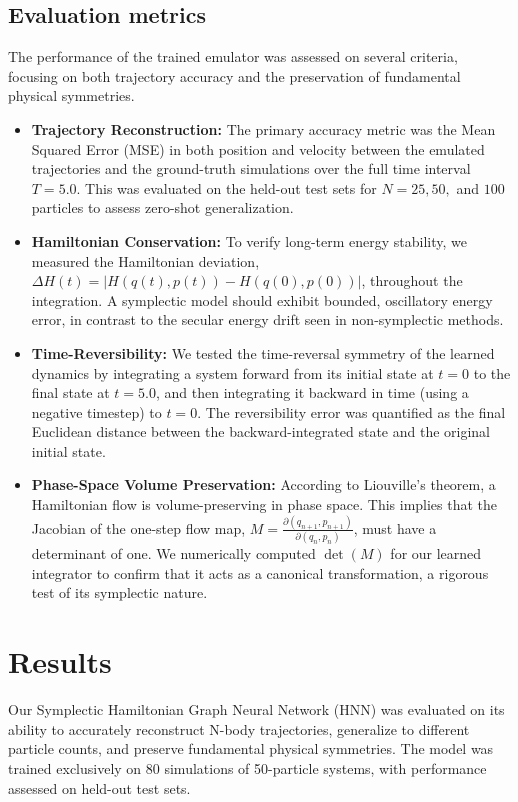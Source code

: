 \documentclass[]{article}
\begin{document}
\subsection{Evaluation metrics}
The performance of the trained emulator was assessed on several criteria, focusing on both trajectory accuracy and the preservation of fundamental physical symmetries.
\begin{itemize}
    \item \textbf{Trajectory Reconstruction:} The primary accuracy metric was the Mean Squared Error (MSE) in both position and velocity between the emulated trajectories and the ground-truth simulations over the full time interval $T=5.0$. This was evaluated on the held-out test sets for $N=25, 50,$ and $100$ particles to assess zero-shot generalization.
    \item \textbf{Hamiltonian Conservation:} To verify long-term energy stability, we measured the Hamiltonian deviation, $\Delta H(t) = |H(q(t), p(t)) - H(q(0), p(0))|$, throughout the integration. A symplectic model should exhibit bounded, oscillatory energy error, in contrast to the secular energy drift seen in non-symplectic methods.
    \item \textbf{Time-Reversibility:} We tested the time-reversal symmetry of the learned dynamics by integrating a system forward from its initial state at $t=0$ to the final state at $t=5.0$, and then integrating it backward in time (using a negative timestep) to $t=0$. The reversibility error was quantified as the final Euclidean distance between the backward-integrated state and the original initial state.
    \item \textbf{Phase-Space Volume Preservation:} According to Liouville's theorem, a Hamiltonian flow is volume-preserving in phase space. This implies that the Jacobian of the one-step flow map, $M = \frac{\partial(q_{n+1}, p_{n+1})}{\partial(q_n, p_n)}$, must have a determinant of one. We numerically computed $\det(M)$ for our learned integrator to confirm that it acts as a canonical transformation, a rigorous test of its symplectic nature.
\end{itemize}

\section{Results}
\label{sec:results}
Our Symplectic Hamiltonian Graph Neural Network (HNN) was evaluated on its ability to accurately reconstruct N-body trajectories, generalize to different particle counts, and preserve fundamental physical symmetries. The model was trained exclusively on 80 simulations of 50-particle systems, with performance assessed on held-out test sets.
\end{document}
